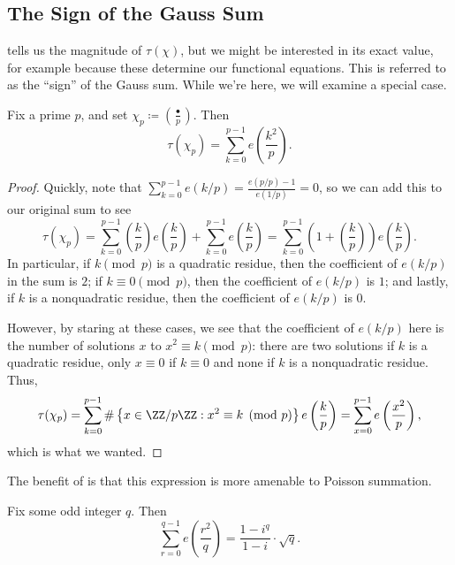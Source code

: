 \documentclass[../notes.tex]{subfiles}
\begin{document}
\subsection{The Sign of the Gauss Sum}
 tells us the magnitude of $\tau(\chi)$, but we might be interested in its exact value, for example because these determine our functional equations. This is referred to as the ``sign'' of the Gauss sum. While we're here, we will examine a special case.
\begin{lemma} \label{lem:adjust-quad-gauss-sum}
	Fix a prime $p$, and set $\chi_p\coloneqq\left(\frac\bullet p\right)$. Then
	\[\tau(\chi_p)=\sum_{k=0}^{p-1}e\left(\frac{k^2}p\right).\]
\end{lemma}
\begin{proof}
	Quickly, note that $\sum_{k=0}^{p-1}e(k/p)=\frac{e(p/p)-1}{e(1/p)}=0$, so we can add this to our original sum to see
	\[\tau(\chi_p)=\sum_{k=0}^{p-1}\left(\frac kp\right)e\left(\frac kp\right)+\sum_{k=0}^{p-1}e\left(\frac kp\right)=\sum_{k=0}^{p-1}\left(1+\left(\frac kp\right)\right)e\left(\frac kp\right).\]
	In particular, if $k\pmod p$ is a quadratic residue, then the coefficient of $e(k/p)$ in the sum is $2$; if $k\equiv0\pmod p$, then the coefficient of $e(k/p)$ is $1$; and lastly, if $k$ is a nonquadratic residue, then the coefficient of $e(k/p)$ is $0$.
	
	However, by staring at these cases, we see that the coefficient of $e(k/p)$ here is the number of solutions $x$ to $x^2\equiv k\pmod p$: there are two solutions if $k$ is a quadratic residue, only $x\equiv0$ if $k\equiv0$ and none if $k$ is a nonquadratic residue. Thus,
	\[\tau(\chi_p)=\sum_{k=0}^{p-1}\#\left\{x\in\ZZ/p\ZZ:x^2\equiv k\pmod p\right\}e\left(\frac kp\right)=\sum_{x=0}^{p-1}e\left(\frac{x^2}p\right),\]
	which is what we wanted.
\end{proof}
The benefit of  is that this expression is more amenable to Poisson summation.
\begin{proposition} \label{prop:evaluation-of-gauss-sum}
	Fix some odd integer $q$. Then
	\[\sum_{r=0}^{q-1}e\left(\frac{r^2}q\right)=\frac{1-i^q}{1-i}\cdot\sqrt q.\]
\end{proposition}
\end{document}
